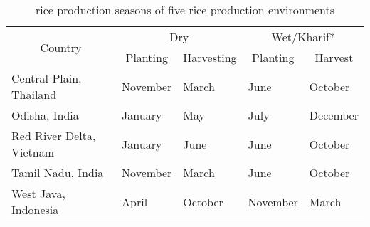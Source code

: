 \begin{table}
\centering
\caption{rice production seasons of five rice production environments}
\label{table:riceproduction_season}
\begin{tabular}{lllll}
\hline
\multicolumn{1}{c}{\multirow{2}{*}{Country}} & \multicolumn{2}{c}{Dry}                                       & \multicolumn{2}{c}{Wet/Kharif*}                            \\
\cline{2-5}
\multicolumn{1}{c}{}                         & \multicolumn{1}{c}{Planting} & \multicolumn{1}{c}{Harvesting} & \multicolumn{1}{c}{Planting} & \multicolumn{1}{c}{Harvest} \\
\hline
Central Plain, Thailand                                     & November                      & March                           & June                       & October                    \\
Odisha, India                                        & January                     & May                            & July                          & December                     \\
Red River Delta, Vietnam                                      & January                     & June                          & June                        & October      \\
Tamil Nadu, India                                        & November                     & March                            & June                          & October                     \\
West Java, Indonesia                                    & April                        & October                        & November                     & March                       \\
\hline               
\end{tabular}
\end{table}